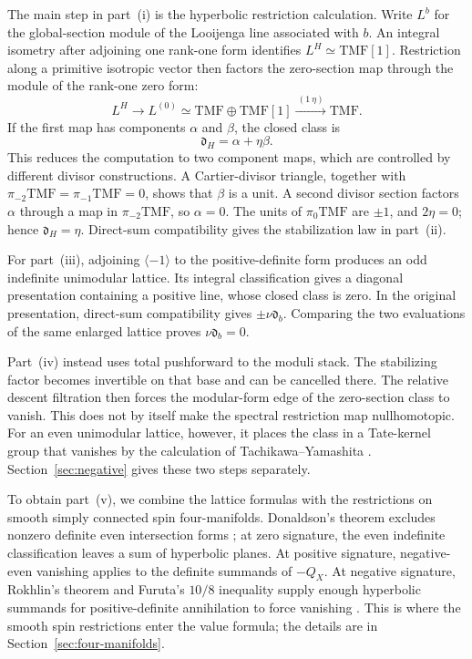 \documentclass[11pt,a4paper]{amsart}
\newcommand{\TMF}{\mathrm{TMF}}
\newcommand{\dclass}{\mathfrak d}
\theoremstyle{plain}
\theoremstyle{definition}
\theoremstyle{remark}
\begin{document}
The main step in part~\textup{(i)} is the hyperbolic restriction
calculation. Write $L^b$ for the global-section module of the
Looijenga line associated with $b$. An integral isometry after
adjoining one rank-one form identifies $L^H\simeq\TMF[1]$.
Restriction along a primitive isotropic vector then factors the
zero-section map through the module of the rank-one zero form:
\[
 L^H\longrightarrow L^{(0)}\simeq\TMF\oplus\TMF[1]
       \xrightarrow{\ (1\ \eta)\ }\TMF.
\]
If the first map has components $\alpha$ and $\beta$, the closed
class is
\[
 \dclass_H=\alpha+\eta\beta.
\]
This reduces the computation to two component maps, which are
controlled by different divisor constructions. A Cartier-divisor
triangle, together with $\pi_{-2}\TMF=\pi_{-1}\TMF=0$,
shows that $\beta$ is a unit. A second divisor section factors
$\alpha$ through a map in $\pi_{-2}\TMF$, so $\alpha=0$.
The units of $\pi_0\TMF$ are $\pm1$, and $2\eta=0$;
hence $\dclass_H=\eta$. Direct-sum compatibility gives the
stabilization law in part~\textup{(ii)}.

For part~\textup{(iii)}, adjoining $\langle-1\rangle$ to the
positive-definite form produces an odd indefinite unimodular
lattice. Its integral classification gives a diagonal presentation
containing a positive line, whose closed class is zero. In the
original presentation, direct-sum compatibility gives
$\pm\nu\dclass_b$. Comparing the two evaluations of the same
enlarged lattice proves $\nu\dclass_b=0$.

Part~\textup{(iv)} instead uses total pushforward to the moduli
stack. The stabilizing factor becomes invertible on that base and
can be cancelled there. The relative descent filtration then
forces the modular-form edge of the zero-section class to vanish.
This does not by itself make the spectral restriction map
nullhomotopic. For an even unimodular lattice, however, it places
the class in a Tate-kernel group that vanishes by the calculation
of Tachikawa--Yamashita \cite{TY}. Section~\ref{sec:negative}
gives these two steps separately.

To obtain part~\textup{(v)}, we combine the lattice formulas
with the restrictions on smooth simply connected spin
four-manifolds. Donaldson's theorem excludes nonzero definite
even intersection forms \cite{Donaldson}; at zero signature,
the even indefinite classification leaves a sum of hyperbolic
planes. At positive signature, negative-even vanishing applies
to the definite summands of $-Q_X$. At negative signature,
Rokhlin's theorem and Furuta's $10/8$ inequality supply enough
hyperbolic summands for positive-definite annihilation to force
vanishing \cite{Rokhlin,Furuta}. This is where the smooth spin
restrictions enter the value formula; the details are in
Section~\ref{sec:four-manifolds}.
\end{document}

